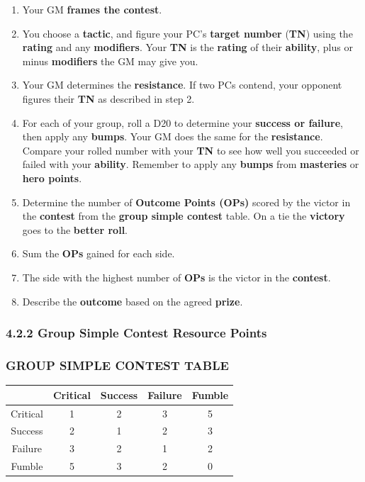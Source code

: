 \documentclass[
]{article}
\providecommand{\tightlist}{%
  \setlength{\itemsep}{0pt}\setlength{\parskip}{0pt}}
\begin{document}
\begin{enumerate}
\def\labelenumi{\arabic{enumi}.}
\tightlist
\item
  Your GM \textbf{frames the contest}.
\item
  You choose a \textbf{tactic}, and figure your PC's \textbf{target
  number} (\textbf{TN}) using the \textbf{rating} and any
  \textbf{modifiers}. Your \textbf{TN} is the \textbf{rating} of their
  \textbf{ability}, plus or minus \textbf{modifiers} the GM may give
  you.
\item
  Your GM determines the \textbf{resistance}. If two PCs contend, your
  opponent figures their \textbf{TN} as described in step 2.
\item
  For each of your group, roll a D20 to determine your \textbf{success
  or failure}, then apply any \textbf{bumps}. Your GM does the same for
  the \textbf{resistance}. Compare your rolled number with your
  \textbf{TN} to see how well you succeeded or failed with your
  \textbf{ability}. Remember to apply any \textbf{bumps} from
  \textbf{masteries} or \textbf{hero points}.
\item
  Determine the number of \textbf{Outcome Points (OPs)} scored by the
  victor in the \textbf{contest} from the \textbf{group simple contest}
  table. On a tie the \textbf{victory} goes to the \textbf{better roll}.
\item
  Sum the \textbf{OPs} gained for each side.
\item
  The side with the highest number of \textbf{OPs} is the victor in the
  \textbf{contest}.
\item
  Describe the \textbf{outcome} based on the agreed \textbf{prize}.
\end{enumerate}

\hypertarget{group-simple-contest-resource-points}{%
\subsubsection{4.2.2 Group Simple Contest Resource
Points}\label{group-simple-contest-resource-points}}

\hypertarget{group-simple-contest-table}{%
\subsubsection{GROUP SIMPLE CONTEST
TABLE}\label{group-simple-contest-table}}

\begin{longtable}[]{@{}ccccc@{}}
\toprule
& Critical & Success & Failure & Fumble\tabularnewline
\midrule
\endhead
Critical & 1 & 2 & 3 & 5\tabularnewline
Success & 2 & 1 & 2 & 3\tabularnewline
Failure & 3 & 2 & 1 & 2\tabularnewline
Fumble & 5 & 3 & 2 & 0\tabularnewline
\bottomrule
\end{longtable}
\end{document}
